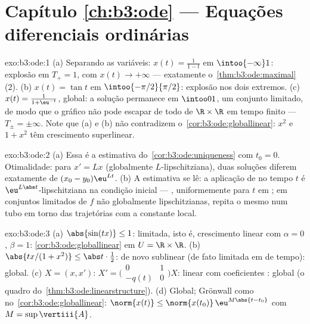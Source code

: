 \section*{Capítulo \ref{ch:b3:ode} --- Equações diferenciais
ordinárias}

\begin{solution}{exo:b3:ode:1}
(a) Separando as variáveis: $x(t) = \frac1{1 - t}$ em
$\intoo{-\infty}1$: explosão em $T_+ = 1$, com $x(t) \to
+\infty$ --- exatamente o~\cref{thm:b3:ode:maximal}(2).
(b) $x(t) = \tan t$ em $\intoo{-\pi/2}{\pi/2}$: explosão nos
dois extremos.
(c) $x(t) = \frac{1}{1 + \eu^{-t}}$, global: a solução
permanece em $\intoo01$, um conjunto limitado, de modo que o gráfico não pode
escapar de todo  de $\R\times\R$ em tempo finito --- $T_\pm
= \pm\infty$. Note que (a) e (b) não contradizem
o~\cref{cor:b3:ode:globallinear}: $x^2$ e $1 + x^2$ têm
crescimento superlinear.
\end{solution}

\begin{solution}{exo:b3:ode:2}
(a) Essa é a estimativa do~\cref{cor:b3:ode:uniqueness} com $t_0
= 0$. Otimalidade: para $x' = Lx$ (globalmente $L$-lipschitziana), duas
soluções diferem exatamente de $(x_0 - y_0)\eu^{Lt}$.
(b) A estimativa se lê: a aplicação de  no tempo $t$ é
$\eu^{L\abs t}$-lipschitziana na condição inicial ---
, uniformemente para $t$ em ; em conjuntos limitados de
$f$ não globalmente lipschitzianas, repita o mesmo num tubo 
em torno das trajetórias com a constante local.
\end{solution}

\begin{solution}{exo:b3:ode:3}
(a) $\abs{\sin(tx)} \leq 1$: limitada, isto é, crescimento linear com
$\alpha = 0$, $\beta = 1$: \cref{cor:b3:ode:globallinear} em
$U = \R\times\R$.
(b) $\abs{tx/(1 + x^2)} \leq \abs t\cdot\frac12$: de novo
sublinear (de fato limitada em  de tempo): global.
(c) $X = (x, x')$: $X' = \bigl(\begin{smallmatrix}0 & 1\\ -q(t)
& 0\end{smallmatrix}\bigr)X$: linear com coeficientes
: global (o quadro do~\cref{thm:b3:ode:linearstructure}).
(d) Global; Grönwall como no~\cref{cor:b3:ode:globallinear}:
$\norm{x(t)} \leq \norm{x(t_0)}\,\eu^{M\abs{t - t_0}}$ com
$M = \sup\vertiii{A}$.
\end{solution}

